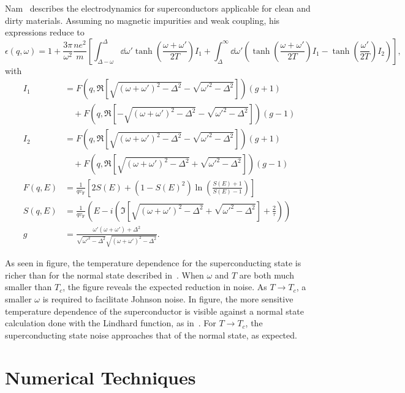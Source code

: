 \documentclass{article}
\newcommand{\vf}{v_{\mathrm{F}}}
\begin{document}
	Nam~\cite{Nam1967} describes the electrodynamics for superconductors applicable for clean and dirty materials.
	Assuming no magnetic impurities and weak coupling, his expressions reduce to
	\begin{equation}
		\epsilon(q, \omega) = 1 + \frac{3 \pi}{\omega^2} \frac{n e^2}{m} \left[\int_{\Delta - \omega}^{\Delta}\dd{\omega'} \tanh(\frac{\omega + \omega'}{2 T}) I_1 + \int_{\Delta}^{\infty} \dd{\omega'} \left( \tanh(\frac{\omega + \omega'}{2 T}) I_1  - \tanh(\frac{\omega'}{2 T})I_2 \right) \right],
	\end{equation}
	with
	\begin{align}
		I_1 &= F(q, \Re[\sqrt{(\omega + \omega')^2 - \Delta^2} - \sqrt{\omega'^2 - \Delta^2}]) (g + 1) \nonumber\\
		&\quad + F(q, \Re[-\sqrt{(\omega + \omega')^2 - \Delta^2} - \sqrt{\omega'^2 - \Delta^2}]) (g - 1) \\
		I_2 &= F(q, \Re[\sqrt{(\omega + \omega')^2 - \Delta^2} - \sqrt{\omega'^2 - \Delta^2}]) (g + 1) \nonumber\\
		&\quad + F(q, \Re[\sqrt{(\omega +  \omega')^2 - \Delta^2} + \sqrt{\omega'^2 - \Delta^2}]) (g - 1) \\
		F(q, E) &= \frac{1}{q \vf} \left[2 S(E) + (1 - S(E)^2)\ln(\frac{S(E) + 1}{S(E) - 1})\right]  \\
		S(q, E) &= \frac{1}{q \vf} \left( E - i \left(\Im[\sqrt{(\omega + \omega')^2 - \Delta^2} + \sqrt{\omega'^2 - \Delta^2}] + \frac{2}{\tau} \right) \right) \\
		g &= \frac{\omega' \left(\omega + \omega'\right) + \Delta^2}{\sqrt{\omega'^2 - \Delta^2}\sqrt{(\omega + \omega')^2 - \Delta^2}}.
	\end{align}

	As seen in figure, the temperature dependence for the superconducting state is richer than for the normal state described in~\cite{QubitRelax}.
	When $\omega$ and $T$ are both much smaller than $T_c$, the figure reveals the expected reduction in noise.
	As $T \rightarrow T_c$, a smaller $\omega$ is required to facilitate Johnson noise.
	In figure, the more sensitive temperature dependence of the superconductor is visible against a normal state calculation done with the Lindhard function, as in~\cite{QubitRelax}.
	For $T \rightarrow T_c$, the superconducting state noise approaches that of the normal state, as expected.

\section{Numerical Techniques \label{sec:technical}}
\end{document}
